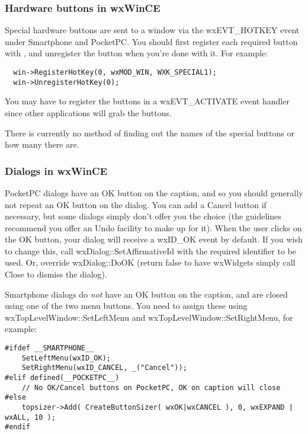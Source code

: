 \subsubsection{Hardware buttons in wxWinCE}

Special hardware buttons are sent to a window via the wxEVT\_HOTKEY event
under Smartphone and PocketPC. You should first register each required button with ,
and unregister the button when you're done with it. For example:

\begin{verbatim}
  win->RegisterHotKey(0, wxMOD_WIN, WXK_SPECIAL1);
  win->UnregisterHotKey(0);
\end{verbatim}

You may have to register the buttons in a wxEVT\_ACTIVATE event handler
since other applications will grab the buttons.

There is currently no method of finding out the names of the special
buttons or how many there are.

\subsubsection{Dialogs in wxWinCE}

PocketPC dialogs have an OK button on the caption, and so you should generally
not repeat an OK button on the dialog. You can add a Cancel button if necessary, but some dialogs
simply don't offer you the choice (the guidelines recommend you offer an Undo facility
to make up for it). When the user clicks on the OK button, your dialog will receive
a wxID\_OK event by default. If you wish to change this, call wxDialog::SetAffirmativeId
with the required identifier to be used. Or, override wxDialog::DoOK (return false to
have wxWidgets simply call Close to dismiss the dialog).

Smartphone dialogs do {\it not} have an OK button on the caption, and are closed
using one of the two menu buttons. You need to assign these using wxTopLevelWindow::SetLeftMenu
and wxTopLevelWindow::SetRightMenu, for example:

\begin{verbatim}
#ifdef __SMARTPHONE__
    SetLeftMenu(wxID_OK);
    SetRightMenu(wxID_CANCEL, _("Cancel"));
#elif defined(__POCKETPC__)
    // No OK/Cancel buttons on PocketPC, OK on caption will close
#else
    topsizer->Add( CreateButtonSizer( wxOK|wxCANCEL ), 0, wxEXPAND | wxALL, 10 );
#endif
\end{verbatim}

